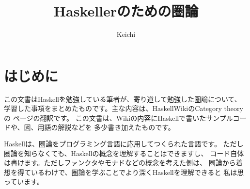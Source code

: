 

\title{Haskellerのための圏論}
\author{Keichi}
\maketitle

\section{はじめに}
この文書はHaskellを勉強している筆者が、寄り道して勉強した圏論について、
学習した事項をまとめたものです。主な内容は、HaskellWikiのCategory theoryの
ページ\cite{wiki}の翻訳です。
この文書は、Wikiの内容にHaskellで書いたサンプルコードや、図、用語の解説などを
多少書き加えたものです。

Haskellは、圏論をプログラミング言語に応用してつくられた言語です。
ただし圏論を知らなくても、Haskellの概念を理解することはできますし、
コード自体は書けます。ただしファンクタやモナドなどの概念を考えた側は、
圏論から着想を得ているわけで、圏論を学ぶことでより深くHaskellを理解できると
私は思っています。

